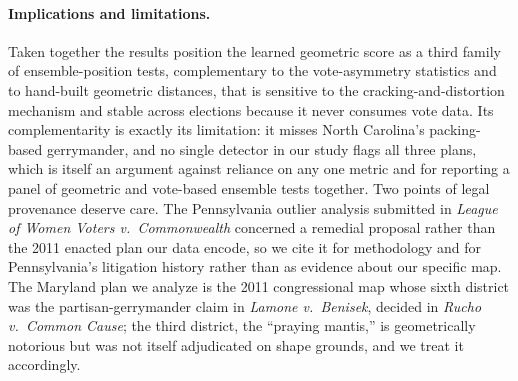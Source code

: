 \paragraph{Implications and limitations.}
Taken together the results position the learned geometric score as a third
family of ensemble-position tests, complementary to the vote-asymmetry
statistics and to hand-built geometric distances, that is sensitive to the
cracking-and-distortion mechanism and stable across elections because it never
consumes vote data. Its complementarity is exactly its limitation: it misses
North Carolina's packing-based gerrymander, and no single detector in our study
flags all three plans, which is itself an argument against reliance on any one
metric \cite{warrington2018comparison, deford2024bounds} and for reporting a
panel of geometric and vote-based ensemble tests together. Two points of legal
provenance deserve care. The Pennsylvania outlier analysis submitted in
\emph{League of Women Voters v.\ Commonwealth} concerned a remedial proposal
rather than the 2011 enacted plan our data encode, so we cite it for methodology
and for Pennsylvania's litigation history rather than as evidence about our
specific map. The Maryland plan we analyze is the 2011 congressional map whose
sixth district was the partisan-gerrymander claim in \emph{Lamone v.\ Benisek},
decided in \emph{Rucho v.\ Common Cause}; the third district, the ``praying
mantis,'' is geometrically notorious but was not itself adjudicated on shape
grounds, and we treat it accordingly.
